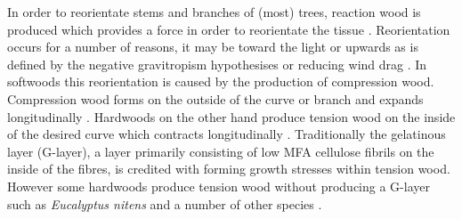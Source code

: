 In order to reorientate stems and branches of (most) trees, reaction wood is
produced which provides a force in order to reorientate the tissue \cite{gardiner2014biology}.
Reorientation occurs for a number of reasons, it may be toward the light or upwards as is defined by the
negative gravitropism hypothesises or reducing wind drag \cite{niklas2012plant}\cite{coutts1995wind}. In softwoods this
reorientation is caused by the production of compression wood. Compression wood
forms on the outside of the curve or branch and expands longitudinally \cite{timell1986compression}. Hardwoods
on the other hand produce tension wood on the inside of the desired curve which
contracts longitudinally \cite{gardiner2014biology}. Traditionally the
gelatinous layer (G-layer), a layer primarily consisting of low MFA cellulose
fibrils on the inside of the fibres, is credited with forming growth stresses
within tension wood. However some hardwoods produce tension wood
without producing a G-layer such as \textit{Eucalyptus nitens} \cite{Qiu_2008} and a number of other species \cite{Ruelle_2006}.
